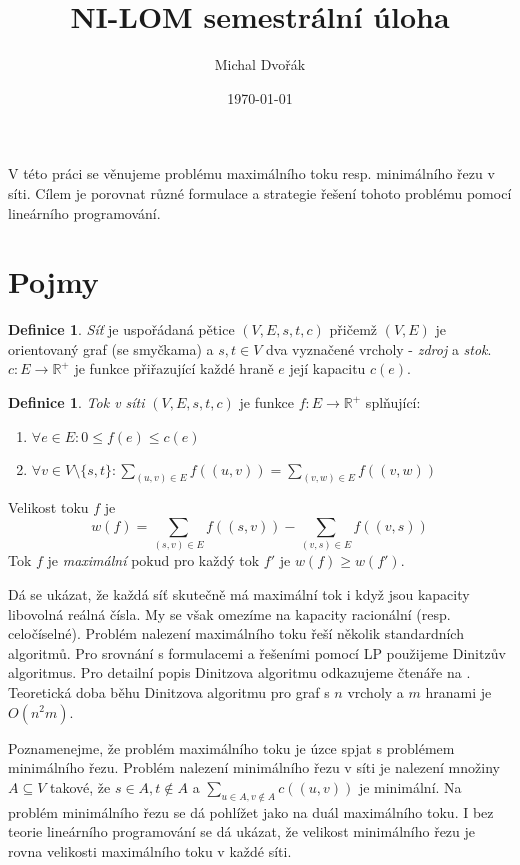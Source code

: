 \documentclass{article}
\title{NI-LOM semestrální úloha}
\author{Michal Dvořák}
\date{\today}
\theoremstyle{plain}
\theoremstyle{definition}
\newtheorem{defn}[thm]{Definice}
\begin{document}
\maketitle

V této práci se věnujeme problému maximálního toku resp. minimálního řezu v síti. Cílem je porovnat různé formulace a strategie řešení tohoto problému pomocí lineárního programování.

\section{Pojmy}

\begin{defn}
	\textit{Síť} je uspořádaná pětice $(V,E,s,t,c)$ přičemž $(V,E)$ je orientovaný graf (se smyčkama) a $s,t\in V$ dva vyznačené vrcholy - \textit{zdroj} a \textit{stok}. $c\colon E\rightarrow \mathbb{R}^+$ je funkce přiřazující každé hraně $e$ její kapacitu $c(e)$.
\end{defn}
\begin{defn}
	\textit{Tok v síti} $(V,E,s,t,c)$ je funkce $f\colon E\rightarrow \mathbb{R}^+$ splňující:
	\begin{enumerate}
		\item $\forall e \in E\colon 0\leq f(e)\leq c(e)$
		\item $\forall v\in V\setminus\{s,t\}\colon \sum_{(u,v)\in E} f((u,v))=\sum_{(v,w)\in E}f((v,w))$
	\end{enumerate}
	Velikost toku $f$ je
	$$
	w(f) = \sum_{(s,v)\in E}f((s,v))-\sum_{(v,s)\in E}f((v,s))
	$$
	Tok $f$ je \textit{maximální} pokud pro každý tok $f'$ je $w(f)\geq w(f')$.
\end{defn}

Dá se ukázat, že každá síť skutečně má maximální tok i když jsou kapacity libovolná reálná čísla. My se však omezíme na kapacity racionální (resp. celočíselné). Problém nalezení maximálního toku řeší několik standardních algoritmů. Pro srovnání s formulacemi a řešeními pomocí LP použijeme Dinitzův algoritmus. Pro detailní popis Dinitzova algoritmu odkazujeme čtenáře na \cite{labyrint}. Teoretická doba běhu Dinitzova algoritmu pro graf s $n$ vrcholy a $m$ hranami je $O(n^2m)$.


Poznamenejme, že problém maximálního toku je úzce spjat s problémem minimálního řezu. Problém nalezení minimálního řezu v síti je nalezení množiny $A\subseteq V$ takové, že $s\in A,t\notin A$ a $\sum_{u\in A,v\notin A}c((u,v))$ je minimální. Na problém minimálního řezu se dá pohlížet jako na duál maximálního toku. I bez teorie lineárního programování se dá ukázat, že velikost minimálního řezu je rovna velikosti maximálního toku v každé síti.
\end{document}
